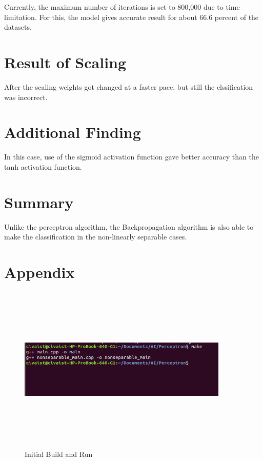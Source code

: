 \documentclass[letterpaper]{article}
\begin{document}
Currently, the maximum number of iterations is set to 800,000 due to time limitation. For this, the model gives accurate result for about 66.6 percent of the datasets. 

\section {Result of Scaling}
After the scaling weights got changed at a faster pace, but still the clssification was incorrect. 

\section {Additional Finding}
In this case, use of the sigmoid activation function gave better accuracy than the tanh activation function. 

\section {Summary}
  Unlike the perceptron algorithm, the Backpropagation algorithm is also able to make the classification in the non-linearly separable cases. 
  
\section {Appendix}

\begin{figure}[h]
\caption{Initial Build and Run}
\centering
\includegraphics[width=10cm,height=8cm]{make}
\end{figure}
\end{document}
